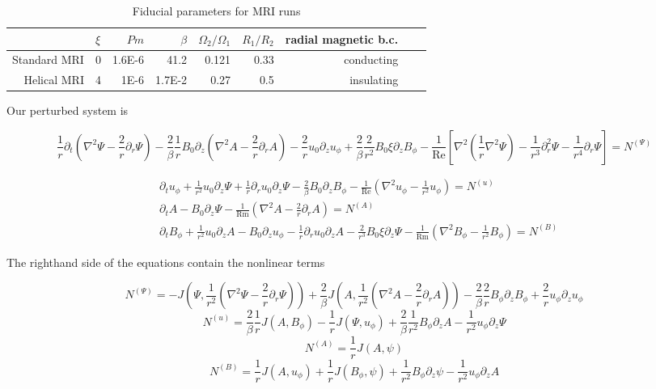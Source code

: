 \documentclass{emulateapj}
\newcommand{\beq}{\begin{equation}}
\newcommand{\eeq}{\end{equation}}
\newcommand\reye{\mathrm{Re}}
\newcommand\reym{\mathrm{Rm}}
\newcommand{\uphi}{\ensuremath{u_\phi}}
\begin{document}
\begin{widetext}
\begin{table}[ht]
\normalsize
\caption{Fiducial parameters for MRI runs} \label{table:parameters}
\centering
{\begin{tabular}{rlrrrrrrr}
  \hline
 & $\xi$ & $Pm$ & $\beta$ & $\Omega_2/\Omega_1$ & $R_1/R_2$ & radial magnetic b.c. \\ 
  \hline\hline
Standard MRI & 0 & 1.6E-6 & 41.2 & 0.121 & 0.33 & conducting \\ 
Helical MRI & 4 & 1E-6 & 1.7E-2 & 0.27 & 0.5 & insulating\\ 
   \hline
\end{tabular}}
\end{table} 

Our perturbed system is 

\beq
\label{eq:Psi_perturbed}
\frac{1}{r}\partial_t (\nabla^2 \Psi - \frac{2}{r} \partial_r \Psi) - \frac{2}{\beta} \frac{1}{r}B_0 \partial_z (\nabla^2 A - \frac{2}{r} \partial_r A) - \frac{2}{r}u_0 \partial_z u_\phi + \frac{2}{\beta} \frac{2}{r^2}B_0 \xi \partial_z B_\phi - \frac{1}{\reye} \left[ \nabla^2 (\frac{1}{r} \nabla^2 \Psi) - \frac{1}{r^3} \partial_r^2 \Psi - \frac{1}{r^4}\partial_r\Psi\right] = N^{(\Psi)}
\eeq

\begin{align}
& \partial_t \uphi + \frac{1}{r^2} u_0 \partial_z \Psi + \frac{1}{r} \partial_r u_0 \partial_z \Psi - \frac{2}{\beta} B_0 \partial_z B_\phi - \frac{1}{\reye} ( \nabla^2 \uphi - \frac{1}{r^2} \uphi ) = N^{(u)} \label{eq:uphi_perturbed} \\
& \partial_t A - B_0 \partial_z \Psi - \frac{1}{\reym} ( \nabla^2 A - \frac{2}{r} \partial_r A )= N^{(A)}  \label{eq:A_perturbed}\\
  \label{eq:Bphi_perturbed}
& \partial_t B_\phi + \frac{1}{r^2} u_0 \partial_z A - B_0 \partial_z u_\phi - \frac{1}{r} \partial_r u_0 \partial_z A - \frac{2}{r^3} B_0 \xi \partial_z \Psi - \frac{1}{\reym} (\nabla^2 B_\phi - \frac{1}{r^2} B_\phi ) = N^{(B)}
\end{align}

The righthand side of the equations contain the nonlinear terms

\beq
N^{(\Psi)} = - J(\Psi, \frac{1}{r^2} ( \nabla^2 \Psi - \frac{2}{r} \partial_r\Psi) ) + \frac{2}{\beta} J(A, \frac{1}{r^2} ( \nabla^2 A - \frac{2}{r} \partial_rA) ) - \frac{2}{\beta} \frac{2}{r}B_\phi \partial_z B_\phi  + \frac{2}{r} u_\phi \partial_z u_\phi 
\eeq
\beq
N^{(u)} = \frac{2}{\beta} \frac{1}{r} J(A, B_\phi) - \frac{1}{r} J(\Psi, \uphi) + \frac{2}{\beta}\frac{1}{r^2} B_\phi \partial_z A - \frac{1}{r^2} \uphi \partial_z \Psi 
\eeq
\beq
N^{(A)} = \frac{1}{r} J(A, \psi)
\eeq
\beq
N^{(B)} = \frac{1}{r} J(A, \uphi) + \frac{1}{r} J(B_\phi, \psi) + \frac{1}{r^2} B_\phi \partial_z \psi - \frac{1}{r^2} \uphi \partial_z A 
\label{eq:nonlinear_B}
\eeq
\end{widetext}
\end{document}
